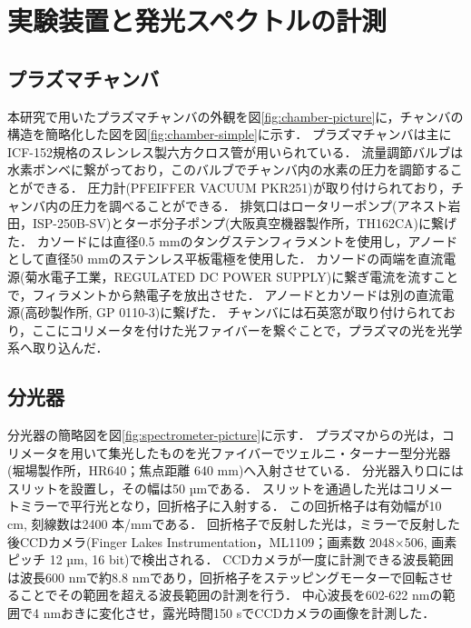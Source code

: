 \chapter{実験装置と発光スペクトルの計測}
\section{プラズマチャンバ}
本研究で用いたプラズマチャンバの外観を図\ref{fig:chamber-picture}に，チャンバの構造を簡略化した図を図\ref{fig:chamber-simple}に示す．
プラズマチャンバは主にICF-152規格のスレンレス製六方クロス管が用いられている．
流量調節バルブは水素ボンベに繋がっており，このバルブでチャンバ内の水素の圧力を調節することができる．
圧力計(PFEIFFER VACUUM PKR251)が取り付けられており，チャンバ内の圧力を調べることができる．
排気口はロータリーポンプ(アネスト岩田，ISP-250B-SV)とターボ分子ポンプ(大阪真空機器製作所，TH162CA)に繋げた．
カソードには直径0.5 mmのタングステンフィラメントを使用し，アノードとして直径50 mmのステンレス平板電極を使用した．
カソードの両端を直流電源(菊水電子工業，REGULATED DC POWER SUPPLY)に繋ぎ電流を流すことで，フィラメントから熱電子を放出させた．
アノードとカソードは別の直流電源(高砂製作所, GP 0110-3)に繋げた．
チャンバには石英窓が取り付けられており，ここにコリメータを付けた光ファイバーを繋ぐことで，プラズマの光を光学系へ取り込んだ．

\section{分光器}
分光器の簡略図を図\ref{fig:spectrometer-picture}に示す．
プラズマからの光は，コリメータを用いて集光したものを光ファイバーでツェルニ・ターナー型分光器(堀場製作所，HR640；焦点距離 640 mm)へ入射させている．
分光器入り口にはスリットを設置し，その幅は50 µmである．
スリットを通過した光はコリメートミラーで平行光となり，回折格子に入射する．
この回折格子は有効幅が10 cm, 刻線数は2400 本/mmである．
回折格子で反射した光は，ミラーで反射した後CCDカメラ(Finger Lakes Instrumentation，ML1109；画素数 2048×506, 画素ピッチ 12 µm, 16 bit)で検出される．
CCDカメラが一度に計測できる波長範囲は波長600 nmで約8.8 nmであり，回折格子をステッピングモーターで回転させることでその範囲を超える波長範囲の計測を行う．
中心波長を602-622 nmの範囲で4 nmおきに変化させ，露光時間150 sでCCDカメラの画像を計測した．

